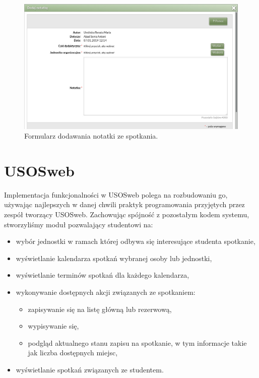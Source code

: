 \documentclass[licencjacka]{pracamgr}
\begin{document}
\begin{itemize}
\begin{figure}[b!]
  \includegraphics[width=\linewidth]{formularz_notatek.jpg}
  \caption{Formularz dodawania notatki ze spotkania.}
  \label{fig:formularz_notatek}
\end{figure}



\section{USOSweb}\label{sec:impusosweb}
Implementacja funkcjonalności w USOSweb polega na rozbudowaniu go, używając najlepszych w danej chwili praktyk programowania przyjętych przez zespół tworzący USOSweb. Zachowując spójność z pozostałym kodem systemu, stworzyliśmy moduł pozwalający studentowi na:
\begin{itemize}
\item{wybór jednostki w ramach której odbywa się interesujące studenta spotkanie,}
\item{wyświetlanie kalendarza spotkań wybranej osoby lub jednostki,}
\item{wyświetlanie terminów spotkań dla każdego kalendarza,}
\item{wykonywanie dostępnych akcji związanych ze spotkaniem:
\begin{itemize}
\item{zapisywanie się na listę główną lub rezerwową,}
\item{wypisywanie się,}
\item{podgląd aktualnego stanu zapisu na spotkanie, w tym informacje takie jak liczba dostępnych miejsc,}
\end{itemize}
}
\item{wyświetlanie spotkań związanych ze studentem.}
\end{itemize}


\end{itemize}
\end{document}

